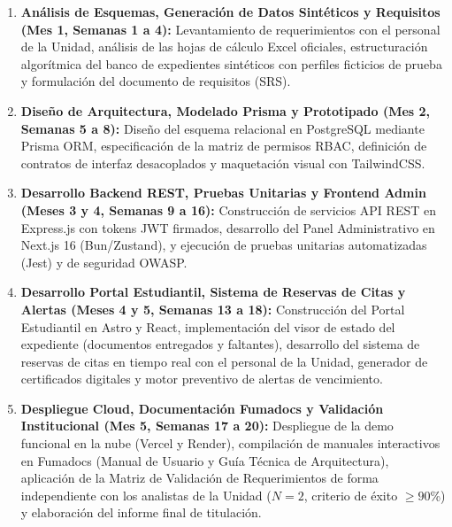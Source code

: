 \begin{enumerate}[label=\textbf{Fase \arabic*:},leftmargin=*]
    \item \textbf{Análisis de Esquemas, Generación de Datos Sintéticos y Requisitos (Mes 1, Semanas 1 a 4):} Levantamiento de requerimientos con el personal de la Unidad, análisis de las hojas de cálculo Excel oficiales, estructuración algorítmica del banco de expedientes sintéticos con perfiles ficticios de prueba y formulación del documento de requisitos (SRS).
    \item \textbf{Diseño de Arquitectura, Modelado Prisma y Prototipado (Mes 2, Semanas 5 a 8):} Diseño del esquema relacional en PostgreSQL mediante Prisma ORM, especificación de la matriz de permisos RBAC, definición de contratos de interfaz desacoplados y maquetación visual con TailwindCSS.
    \item \textbf{Desarrollo Backend REST, Pruebas Unitarias y Frontend Admin (Meses 3 y 4, Semanas 9 a 16):} Construcción de servicios API REST en Express.js con tokens JWT firmados, desarrollo del Panel Administrativo en Next.js 16 (Bun/Zustand), y ejecución de pruebas unitarias automatizadas (Jest) y de seguridad OWASP.
    \item \textbf{Desarrollo Portal Estudiantil, Sistema de Reservas de Citas y Alertas (Meses 4 y 5, Semanas 13 a 18):} Construcción del Portal Estudiantil en Astro y React, implementación del visor de estado del expediente (documentos entregados y faltantes), desarrollo del sistema de reservas de citas en tiempo real con el personal de la Unidad, generador de certificados digitales y motor preventivo de alertas de vencimiento.
    \item \textbf{Despliegue Cloud, Documentación Fumadocs y Validación Institucional (Mes 5, Semanas 17 a 20):} Despliegue de la demo funcional en la nube (Vercel y Render), compilación de manuales interactivos en Fumadocs (Manual de Usuario y Guía Técnica de Arquitectura), aplicación de la Matriz de Validación de Requerimientos de forma independiente con los analistas de la Unidad ($N = 2$, criterio de éxito $\ge 90$\%) y elaboración del informe final de titulación.
\end{enumerate}
